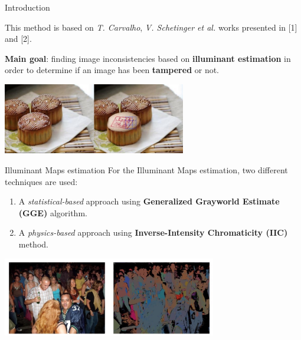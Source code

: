 
\begin{tframe}{Introduction}

This method is based on \emph{T. Carvalho}, \emph{V. Schetinger et al. }works presented in [1] and [2].
\vspace{1cm}

\textbf{Main goal}: finding image inconsistencies based on \textbf{illuminant estimation} in order to determine if an image has been \textbf{tampered} or not.

\begin{center}
\includegraphics[width=0.6\textwidth]{images/cakes.jpg}
\end{center}

\end{tframe}

\begin{tframe}{Illuminant Maps estimation}
\vspace{0.2cm}
For the Illuminant Maps estimation, two different techniques are used: 
\vspace{0.3cm}
\begin{enumerate}
\item A \emph{statistical-based} approach using \textbf{Generalized Grayworld Estimate (GGE)} algorithm.
\vspace{0.2cm}
\item A \emph{physics-based} approach using \textbf{Inverse-Intensity Chromaticity (IIC)} method.
\end{enumerate}

\begin{center}
\includegraphics[width=0.7\textwidth]{images/riess.jpg}
\end{center}
\end{tframe}


